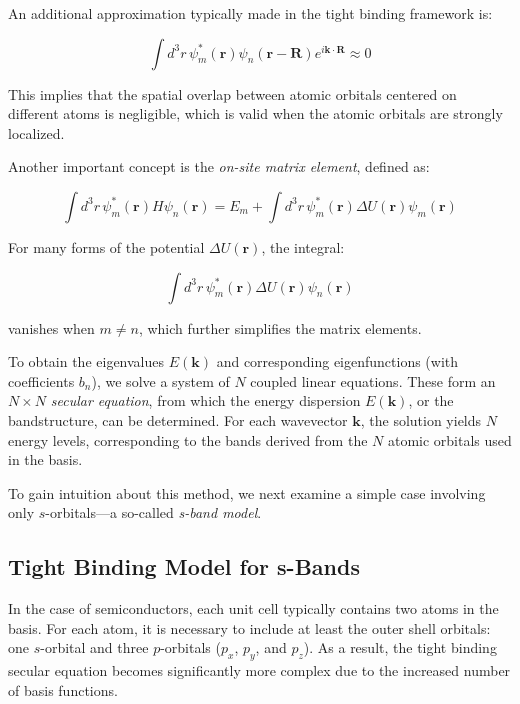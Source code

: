 An additional approximation typically made in the tight binding framework is:

\begin{equation}
	\int d^3r \, \psi_m^*(\mathbf{r}) \psi_n(\mathbf{r} - \mathbf{R}) e^{i\mathbf{k} \cdot \mathbf{R}} \approx 0
\end{equation}

\noindent
This implies that the spatial overlap between atomic orbitals centered on different atoms is negligible, which is valid when the atomic orbitals are strongly localized.

Another important concept is the \textit{on-site matrix element}, defined as:

\begin{equation}
	\int d^3r \, \psi_m^*(\mathbf{r}) H \psi_n(\mathbf{r}) = E_m + \int d^3r \, \psi_m^*(\mathbf{r}) \Delta U(\mathbf{r}) \psi_m(\mathbf{r})
\end{equation}

\noindent
For many forms of the potential \( \Delta U(\mathbf{r}) \), the integral:

\begin{equation}
	\int d^3r \, \psi_m^*(\mathbf{r}) \Delta U(\mathbf{r}) \psi_n(\mathbf{r})
\end{equation}

\noindent
vanishes when \( m \neq n \), which further simplifies the matrix elements.

To obtain the eigenvalues \( E(\mathbf{k}) \) and corresponding eigenfunctions (with coefficients \( b_n \)), we solve a system of \( N \) coupled linear equations. These form an \( N \times N \) \textit{secular equation}, from which the energy dispersion \( E(\mathbf{k}) \), or the bandstructure, can be determined. For each wavevector \( \mathbf{k} \), the solution yields \( N \) energy levels, corresponding to the bands derived from the \( N \) atomic orbitals used in the basis.

To gain intuition about this method, we next examine a simple case involving only $s$-orbitals—a so-called \textit{s-band model}.

\subsection{Tight Binding Model for s-Bands}
In the case of semiconductors, each unit cell typically contains two atoms in the basis. For each atom, it is necessary to include at least the outer shell orbitals: one \(s\)-orbital and three \(p\)-orbitals (\(p_x\), \(p_y\), and \(p_z\)). As a result, the tight binding secular equation becomes significantly more complex due to the increased number of basis functions.


